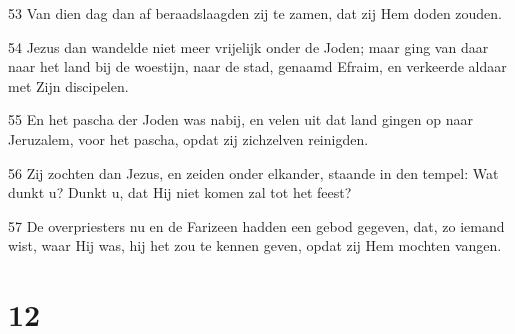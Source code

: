 \par 53 Van dien dag dan af beraadslaagden zij te zamen, dat zij Hem doden zouden.
\par 54 Jezus dan wandelde niet meer vrijelijk onder de Joden; maar ging van daar naar het land bij de woestijn, naar de stad, genaamd Efraim, en verkeerde aldaar met Zijn discipelen.
\par 55 En het pascha der Joden was nabij, en velen uit dat land gingen op naar Jeruzalem, voor het pascha, opdat zij zichzelven reinigden.
\par 56 Zij zochten dan Jezus, en zeiden onder elkander, staande in den tempel: Wat dunkt u? Dunkt u, dat Hij niet komen zal tot het feest?
\par 57 De overpriesters nu en de Farizeen hadden een gebod gegeven, dat, zo iemand wist, waar Hij was, hij het zou te kennen geven, opdat zij Hem mochten vangen.

\chapter{12}

